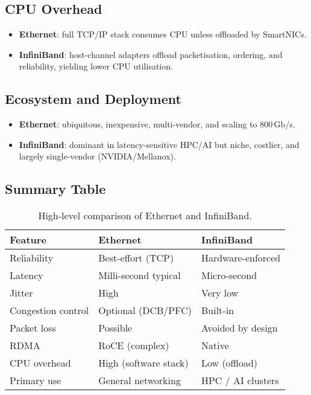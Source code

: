 \documentclass[../../../OAE-SPEC-MAIN.tex]{subfiles}
\begin{document}
\subsection{CPU Overhead}
\begin{itemize}
  \item \textbf{Ethernet}: full TCP/IP stack consumes CPU unless
        offloaded by SmartNICs.
  \item \textbf{InfiniBand}: host-channel adapters offload
        packetisation, ordering, and reliability, yielding lower CPU
        utilisation.
\end{itemize}

\subsection{Ecosystem and Deployment}
\begin{itemize}
  \item \textbf{Ethernet}: ubiquitous, inexpensive, multi-vendor, and
        scaling to 800\,Gb/s.
  \item \textbf{InfiniBand}: dominant in latency-sensitive HPC/AI
        but niche, costlier, and largely single-vendor (NVIDIA/Mellanox).
\end{itemize}

\subsection{Summary Table}
\begin{table}[h]
\centering
\small
\begin{tabular}{lll}
\toprule
\textbf{Feature} & \textbf{Ethernet} & \textbf{InfiniBand}\\
\midrule
Reliability        & Best-effort (TCP)         & Hardware-enforced\\
Latency            & Milli-second typical      & Micro-second\\
Jitter             & High                     & Very low\\
Congestion control & Optional (DCB/PFC)       & Built-in\\
Packet loss        & Possible                 & Avoided by design\\
RDMA               & RoCE (complex)           & Native\\
CPU overhead       & High (software stack)    & Low (offload)\\
Primary use        & General networking       & HPC / AI clusters\\
\bottomrule
\end{tabular}
\caption{High-level comparison of Ethernet and InfiniBand.}
\end{table}
\end{document}
